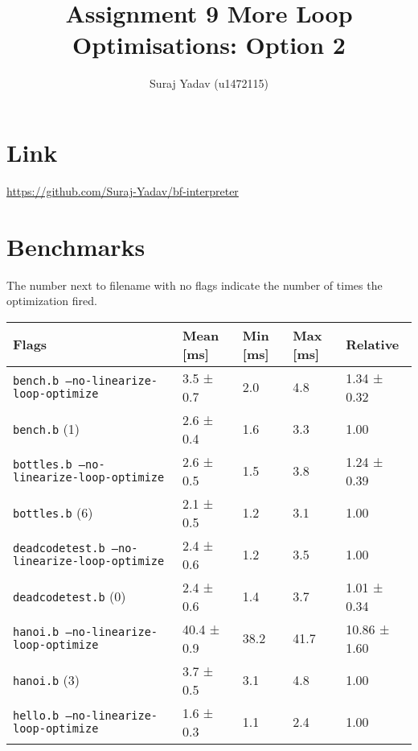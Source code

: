 \documentclass[11pt,answers]{exam}
\title{Assignment 9 More Loop Optimisations: Option 2}
\author{Suraj Yadav (u1472115)}
\begin{document}
\maketitle
\section{Link}
\url{https://github.com/Suraj-Yadav/bf-interpreter}
\section{Benchmarks}
The number next to filename with no flags indicate the number of times the optimization fired.
\begin{table}[H]
	\raggedright
	\begin{tabular}{|l|l|l|l|l|}
		\hline
		\textbf{Flags}                                       & \textbf{Mean [ms]} & \textbf{Min [ms]} & \textbf{Max [ms]} & \textbf{Relative} \\ \hline
		\texttt{bench.b --no-linearize-loop-optimize}        & 3.5 ± 0.7          & 2.0               & 4.8               & 1.34 ± 0.32       \\ \hline
		\texttt{bench.b} (1)                                 & 2.6 ± 0.4          & 1.6               & 3.3               & 1.00              \\ \hline
		\hline
		\texttt{bottles.b --no-linearize-loop-optimize}      & 2.6 ± 0.5          & 1.5               & 3.8               & 1.24 ± 0.39       \\ \hline
		\texttt{bottles.b} (6)                               & 2.1 ± 0.5          & 1.2               & 3.1               & 1.00              \\ \hline
		\hline
		\texttt{deadcodetest.b --no-linearize-loop-optimize} & 2.4 ± 0.6          & 1.2               & 3.5               & 1.00              \\ \hline
		\texttt{deadcodetest.b} (0)                          & 2.4 ± 0.6          & 1.4               & 3.7               & 1.01 ± 0.34       \\ \hline
		\hline
		\texttt{hanoi.b --no-linearize-loop-optimize}        & 40.4 ± 0.9         & 38.2              & 41.7              & 10.86 ± 1.60      \\ \hline
		\texttt{hanoi.b} (3)                                 & 3.7 ± 0.5          & 3.1               & 4.8               & 1.00              \\ \hline
		\hline
		\texttt{hello.b --no-linearize-loop-optimize}        & 1.6 ± 0.3          & 1.1               & 2.4               & 1.00              \\ \hline

\end{tabular}
\end{table}
\end{document}
